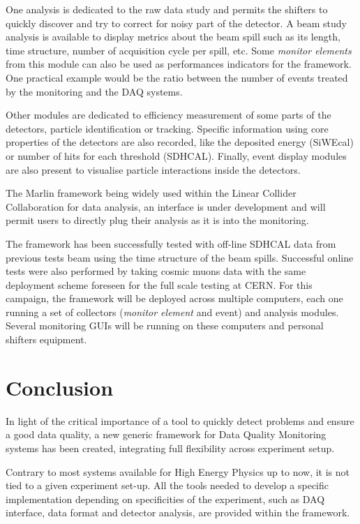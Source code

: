 \documentclass[conference]{IEEEtran}
\begin{document}
One analysis is dedicated to the raw data study and permits the shifters to quickly discover and try to correct for noisy part of the detector. A beam study analysis is available to display metrics about the beam spill such as its length, time structure, number of acquisition cycle per spill, etc. Some \textit{monitor elements} from this module can also be used as performances indicators for the framework. One practical example would be the ratio between the number of events treated by the monitoring and the DAQ systems.

Other modules are dedicated to efficiency measurement of some parts of the detectors, particle identification or tracking. Specific information using core properties of the detectors are also recorded, like the deposited energy (SiWEcal) or number of hits for each threshold (SDHCAL). Finally, event display modules are also present to visualise particle interactions inside the detectors.

The Marlin\cite{MARLIN} framework being widely used within the Linear Collider Collaboration for data analysis, an interface is under development and will permit users to directly plug their analysis as it is into the monitoring.

The framework has been successfully tested with off-line SDHCAL data from previous tests beam using the time structure of the beam spills. Successful online tests were also performed by taking cosmic muons data with the same deployment scheme foreseen for the full scale testing at CERN. For this campaign, the framework will be deployed across multiple computers, each one running a set of collectors (\textit{monitor element} and event) and analysis modules. Several monitoring GUIs will be running on these computers and personal shifters equipment.


\section{Conclusion}
In light of the critical importance of a tool to quickly detect problems and ensure a good data quality, a new generic framework for Data Quality Monitoring systems has been created, integrating full flexibility across experiment setup.

Contrary to most systems available for High Energy Physics up to now, it is not tied to a given experiment set-up. All the tools needed to develop a specific implementation depending on specificities of the experiment, such as DAQ interface, data format and detector analysis, are provided within the framework.
\end{document}
